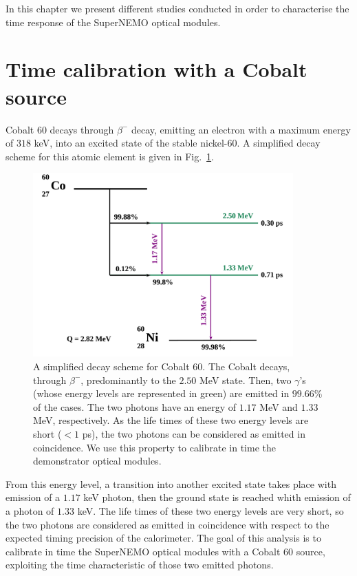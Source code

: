 In this chapter we present different studies conducted in order to characterise the time response of the SuperNEMO optical modules.


\section{Time calibration with a Cobalt source}
\label{sec:CoSource}
Cobalt $60$ decays through $\beta^{-}$ decay, emitting an electron with a maximum energy of $318$ keV, into an excited state of the stable nickel-60.
A simplified decay scheme for this atomic element is given in Fig.~\ref{fig:Co_decay_scheme}.
\begin{figure}[h]
  \centering
  \includegraphics[width=10cm]{commissioning/fig_commissioning/Co_decay_scheme.pdf}
  \caption{A simplified decay scheme for Cobalt $60$.
    The Cobalt decays, through $\beta^{-}$, predominantly to the $2.50$ MeV state.
    Then, two $\gamma$'s (whose energy levels are represented in green) are emitted in $99.66$\% of the cases.
    The two photons have an energy of $1.17$ MeV and $1.33$ MeV, respectively.
    As the life times of these two energy levels are short ($<1$ ps), the two photons can be considered as emitted in coincidence.
    We use this property to calibrate in time the demonstrator optical modules.
    \label{fig:Co_decay_scheme}}
\end{figure}
From this energy level, a transition into another excited state takes place with emission of a $1.17$ keV photon, then the ground state is reached whith emission of a photon of $1.33$ keV.
The life times of these two energy levels are very short, so the two photons are considered as emitted in coincidence with respect to the expected timing precision of the calorimeter.
The goal of this analysis is to calibrate in time the SuperNEMO optical modules with a Cobalt $60$ source, exploiting the time characteristic of those two emitted photons.

